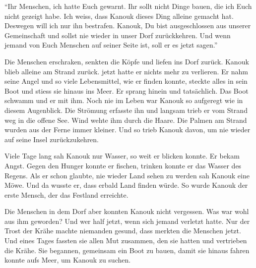 \enquote{Ihr Menschen, ich hatte Euch gewarnt. Ihr sollt nicht Dinge bauen, die ich Euch nicht gezeigt habe. Ich weiss, dass Kanouk dieses Ding alleine gemacht hat. Deswegen will ich nur ihn bestrafen. Kanouk, Du bist ausgeschlossen aus unserer Gemeinschaft und sollst nie wieder in unser Dorf zurückkehren. Und wenn jemand von Euch Menschen auf seiner Seite ist, soll er es jetzt sagen.}

Die Menschen erschraken, senkten die Köpfe und liefen ins Dorf zurück. Kanouk blieb alleine am Strand zurück. jetzt hatte er nichts mehr zu verlieren. Er nahm seine Angel und so viele Lebensmittel, wie er finden konnte, steckte alles in sein Boot und stiess sie hinaus ins Meer. Er sprang hinein und tatsächlich. Das Boot schwamm und er mit ihm. Noch nie im Leben war Kanouk so aufgeregt wie in diesem Augenblick. Die Strömung erfasste ihn und langsam trieb er vom Strand weg in die offene See. Wind wehte ihm durch die Haare. Die Palmen am Strand wurden aus der Ferne immer kleiner. Und so trieb Kanouk davon, um nie wieder auf seine Insel zurückzukehren.

Viele Tage lang sah Kanouk nur Wasser, so weit er blicken konnte. Er bekam Angst. Gegen den Hunger konnte er fischen, trinken konnte er das Wasser des Regens. Als er schon glaubte, nie wieder Land sehen zu werden sah Kanouk eine Möwe. Und da wusste er, dass erbald Land finden würde. So wurde Kanouk der erste Mensch, der das Festland erreichte.

Die Menschen in dem Dorf aber konnten Kanouk nicht vergessen. Was war wohl aus ihm geworden? Und wer half jetzt, wenn sich jemand verletzt hatte. Nur der Trost der Krähe machte niemanden gesund, dass merkten die Menschen jetzt. Und eines Tages fassten sie allen Mut zusammen, den sie hatten und vertrieben die Krähe. Sie begannen, gemeinsam ein Boot zu bauen, damit sie hinaus fahren konnte aufs Meer, um Kanouk zu suchen. \hfill {\color{red}\decofourleft}
